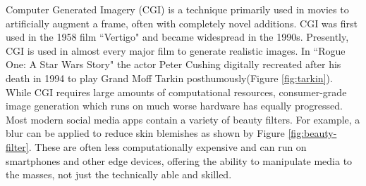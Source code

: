 Computer Generated Imagery (CGI) is a technique primarily used in movies to artificially augment a frame, often with completely novel additions. CGI was first used in the 1958 film ``Vertigo" and became widespread in the 1990s\cite{ozturk2023vicious}. Presently, CGI is used in almost every major film to generate realistic images. In ``Rogue One: A Star Wars Story" the actor Peter Cushing digitally recreated after his death in 1994 to play Grand Moff Tarkin posthumously(Figure \ref{fig:tarkin}). While CGI requires large amounts of computational resources, consumer-grade image generation which runs on much worse hardware has equally progressed. Most modern social media apps contain a variety of beauty filters\cite{corcoran2014digital}. For example, a blur can be applied to reduce skin blemishes as shown by Figure \ref{fig:beauty-filter}. These are often less computationally expensive and can run on smartphones and other edge devices, offering the ability to manipulate media to the masses, not just the technically able and skilled.

